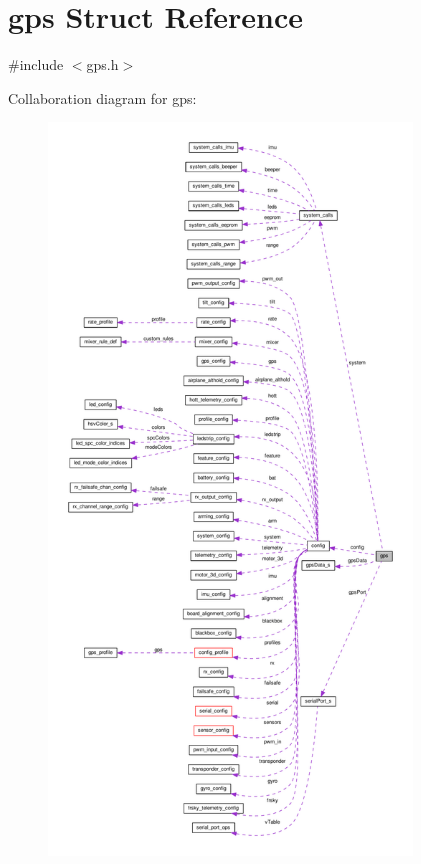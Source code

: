 \hypertarget{structgps}{\section{gps Struct Reference}
\label{structgps}
}


{\ttfamily \#include $<$gps.\+h$>$}



Collaboration diagram for gps\+:\nopagebreak
\begin{figure}[H]
\begin{center}
\leavevmode
\includegraphics[height=550pt]{structgps__coll__graph}
\end{center}
\end{figure}
